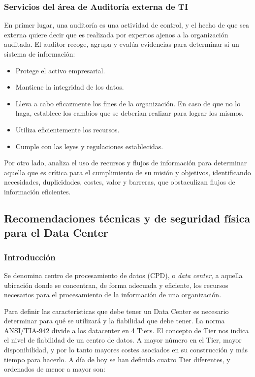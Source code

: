     \subsubsection{Servicios del área de Auditoría externa de TI}
    
    En primer lugar, una auditoría es una actividad de control, y el hecho de que sea externa quiere decir que es realizada por expertos ajenos a la organización auditada.
    El auditor recoge, agrupa y evalúa evidencias para determinar si un sistema de información:
    
    \begin{itemize}
		\item Protege el activo empresarial.
        \item Mantiene la integridad de los datos.
        \item Lleva a cabo eficazmente los fines de la organización. En caso de que no lo haga, establece los cambios que se deberían realizar para lograr los mismos.
        \item Utiliza eficientemente los recursos.
        \item Cumple con las leyes y regulaciones establecidas.
	\end{itemize}
    
    Por otro lado, analiza el uso de recursos y flujos de información para determinar aquella que es crítica para el cumplimiento de su misión y objetivos, identificando necesidades, duplicidades, costes, valor y barreras, que obstaculizan flujos de información eficientes.
    
    
    \newpage
    
    \subsection{Recomendaciones técnicas y de seguridad física para el Data Center}
    
    \subsubsection{Introducción}
    Se denomina centro de procesamiento de datos (CPD), o \textit{data center}, a aquella ubicación donde se concentran, de forma adecuada y eficiente, los recursos necesarios para el procesamiento de la información de una organización.
    
    Para definir las características que debe tener un Data Center es necesario determinar para qué se utilizará y la fiabilidad que debe tener. La norma  ANSI/TIA-942 divide a los datacenter en 4 Tiers. El concepto de Tier nos indica el nivel de fiabilidad de un centro de datos. A mayor número en el Tier, mayor disponibilidad, y por lo tanto mayores costes asociados en su construcción y más tiempo para hacerlo. A día de hoy se han definido cuatro Tier diferentes, y ordenados de menor a mayor son:
    
